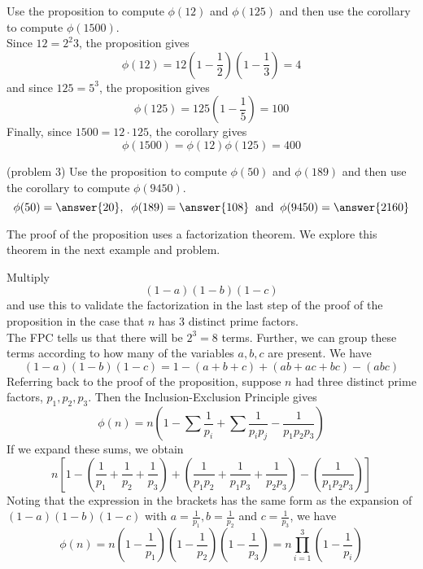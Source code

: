 \documentclass[handout]{ximera}
\begin{document}
\begin{example}[example 3]
Use the proposition to compute $\phi(12)$ and $\phi(125)$ and then use the corollary to compute $\phi(1500)$.\\
Since $12 = 2^2 3$, the proposition gives
\[
\phi(12) = 12\left(1-\frac12\right)\left(1-\frac13\right) = 4
\]
and since $125 = 5^3$, the proposition gives
\[
\phi(125) = 125\left(1-\frac15\right) = 100
\]
Finally, since $1500 = 12 \cdot 125$, the corollary gives
\[
\phi(1500) = \phi(12)\phi(125) = 400
\]
\end{example}

\begin{problem}(problem 3)
Use the proposition to compute $\phi(50)$ and $\phi(189)$ and then use the corollary to compute 
$\phi(9450)$.\\
\[
\phi(50) = \answer{20}, \;\; \phi(189) = \answer{108} \;\; \text{and} \;\; \phi(9450)= \answer{2160}
\]
\end{problem}

The proof of the proposition uses a factorization theorem. We explore this theorem in the next example and problem.

\begin{example}[example 4]
Multiply
\[
(1-a)(1-b)(1-c)
\]
and use this to validate the factorization in the last step of the proof of the proposition in the case that $n$ has 3 distinct prime factors.\\
The FPC tells us that there will be $2^3 = 8$ terms.  Further, we can group these terms according to how many of the variables $a, b, c$ are present. We have
\[
(1-a)(1-b)(1-c) = 1 - (a+b+c) + (ab+ac+bc) - (abc)
\]
Referring back to the proof of the proposition, suppose $n$ had three distinct prime factors, $p_1, p_2, p_3$.
Then the Inclusion-Exclusion Principle gives
\[
\phi(n) = n\left(1 - \sum \frac{1}{p_i} + \sum \frac{1}{p_ip_j} - \frac{1}{p_1p_2p_3}\right)
\]
If we expand these sums, we obtain 
\[
n\left[1 - \left(\frac{1}{p_1} + \frac{1}{p_2}+\frac{1}{p_3}\right) + \left(\frac{1}{p_1p_2} + \frac{1}{p_1p_3} + \frac{1}{p_2p_3}\right) - \left(\frac{1}{p_1p_2p_3}\right)\right]
\]
Noting that the expression in the brackets has the same form as the expansion of $(1-a)(1-b)(1-c)$ with $a = \frac{1}{p_1},
b= \frac{1}{p_2}$ and $c = \frac{1}{p_3}$, we have
\[
 \phi(n) = n\left(1 - \frac{1}{p_1}\right)\left(1 - \frac{1}{p_2}\right)\left(1 - \frac{1}{p_3}\right) = n \prod_{i = 1}^3\left(1 - \frac{1}{p_i}\right)
 \]
 \end{example}
 
\end{document}
